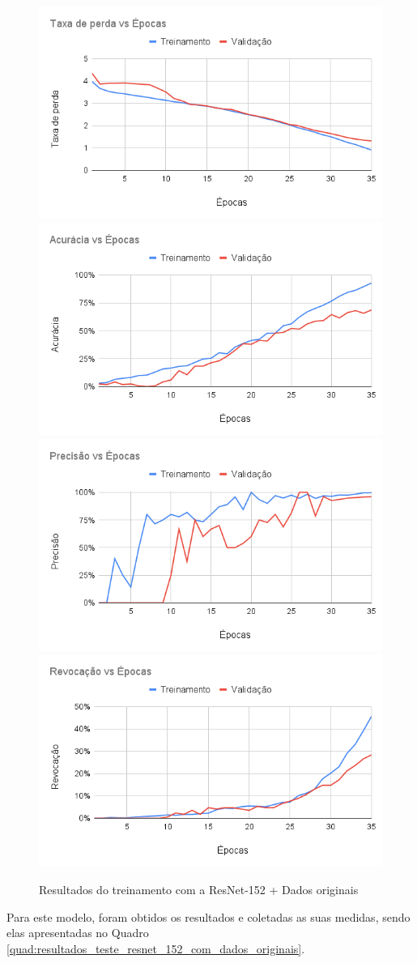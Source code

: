 \documentclass[
	12pt,				%
	oneside,			%
	a4paper,			%
	english,			%
	brazil				%
	]{abntex2ppgsi}
\begin{document}
\begin{figure}[H]
    \centering
    \caption{Resultados do treinamento com a ResNet-152 + Dados originais}
    \includegraphics[width=.50\textwidth]{imagens/resultados_discussao/architecture/resnet_152/original/perda.png}\hfill
    \includegraphics[width=.50\textwidth]{imagens/resultados_discussao/architecture/resnet_152/original/acuracia.png}\bigbreak    \includegraphics[width=.50\textwidth]{imagens/resultados_discussao/architecture/resnet_152/original/precisao.png}\hfill
    \includegraphics[width=.50\textwidth]{imagens/resultados_discussao/architecture/resnet_152/original/revocacao.png}
    \label{fig:resnet_152_dados_originais}
\end{figure}

Para este modelo, foram obtidos os resultados e coletadas as suas medidas, sendo elas apresentadas no Quadro \ref{quad:resultados_teste_resnet_152_com_dados_originais}.
\end{document}
